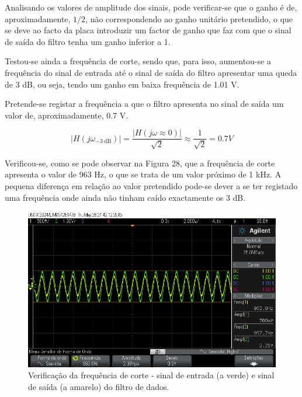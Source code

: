 \documentclass[11pt]{article}
\numberwithin{equation}{section}
\begin{document}
Analisando os valores de amplitude dos sinais, pode verificar-se que o ganho é de, aproximadamente, $1/2$, não correspondendo ao ganho unitário pretendido, o que se deve ao facto da placa introduzir um factor de ganho que faz com que o sinal de saída do filtro tenha um ganho inferior a 1. 

Testou-se ainda a frequência de corte, sendo que, para isso, aumentou-se a frequência do sinal de entrada até o sinal de saída do filtro apresentar uma queda de 3 dB, ou seja, tendo um ganho em baixa frequência de 1.01 V. 

Pretende-se registar a frequência a que o filtro apresenta no sinal de saída um valor de, aproximadamente, 0.7 V.

\vspace{-3mm}
\begin{equation}
	|H(j\omega_{-3~\text{dB}})| = \frac{|H(j\omega \approx 0)|}{\sqrt{2}} \approx \frac{1}{\sqrt{2}} = 0.7 V
\end{equation} 

\vspace{1mm}
Verificou-se, como se pode observar na Figura 28, que a frequência de corte apresenta o valor de 963 Hz, o que se trata de um valor próximo de 1 kHz. A pequena diferença em relação ao valor pretendido pode-se dever a se ter registado uma frequência onde ainda não tinham caído exactamente os 3 dB.

\begin{figure}[H]
	\centering
	\includegraphics[keepaspectratio=true, scale=0.35]{exps/filtro_1k_freqcorte}
	\caption{Verificação da frequência de corte - sinal de entrada (a verde) e sinal de saída (a amarelo) do filtro de dados.}
	\vspace{-0.8em}
\end{figure} 
\end{document}
